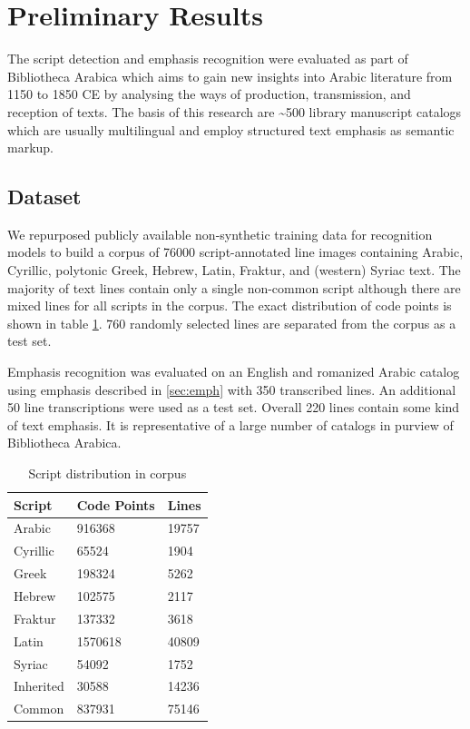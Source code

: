 \section{Preliminary Results}

The script detection and emphasis recognition were evaluated as part of
Bibliotheca Arabica which aims to gain new insights into Arabic literature from
1150 to 1850 CE by analysing the ways of production, transmission, and
reception of texts. The basis of this research are \textasciitilde 500 library
manuscript catalogs which are usually multilingual and employ structured text
emphasis as semantic markup.

\subsection{Dataset}

We repurposed publicly available non-synthetic training data for recognition
models to build a corpus of 76000 script-annotated line images containing
Arabic, Cyrillic, polytonic Greek, Hebrew, Latin, Fraktur, and (western) Syriac
text. The majority of text lines contain only a single non-common script
although there are mixed lines for all scripts in the corpus. The exact
distribution of code points is shown in table \ref{table:points}. 760 randomly
selected lines are separated from the corpus as a test set.

Emphasis recognition was evaluated on an English and romanized Arabic catalog
using emphasis described in \ref{sec:emph} with 350 transcribed lines. An
additional 50 line transcriptions were used as a test set. Overall 220 lines
contain some kind of text emphasis. It is representative of a large number of
catalogs in purview of Bibliotheca Arabica.

\begin{table}
	\centering
	\caption{Script distribution in corpus}
	\label{table:points}
\begin{tabular}{lll} \toprule
	Script & Code Points & Lines\\\midrule
	Arabic & 916368 & 19757\\ 
	Cyrillic & 65524 & 1904\\
	Greek & 198324 & 5262\\
	Hebrew & 102575 & 2117\\
	Fraktur & 137332 & 3618\\
	Latin & 1570618 & 40809\\
	Syriac & 54092 & 1752\\
	Inherited & 30588 & 14236\\
	Common & 837931 & 75146\\ \bottomrule
\end{tabular}
\end{table}


